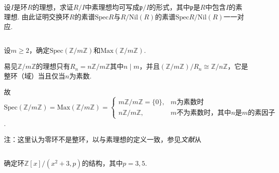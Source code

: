 \subsection{}
设$I$是环$R$的理想，求证$R/I$中素理想均可写成$\mathfrak{p}/I$的形式，其中$\mathfrak{p}$是$R$中包含$I$的素理想. 由此证明交换环$R$的素谱$\mathrm{Spec}R$与$R/\mathrm{Nil}(R)$的素谱$\mathrm{Spec}R/\mathrm{Nil}(R)$一一对应.


\subsection{}
设$m\geq 2$，确定$\mathrm{Spec}(\mathbb{Z}/m\mathbb{Z})$和$\mathrm{Max}(\mathbb{Z}/m\mathbb{Z})$.

\jie 易见$\mathbb{Z}/m\mathbb{Z}$的理想只有$R_n=n\mathbb{Z}/m\mathbb{Z}$其中$n\mid m$，并且$(\mathbb{Z}/m\mathbb{Z})/R_n\cong\mathbb{Z}/n\mathbb{Z}$，它是整环（域）当且仅当$n$为素数.

故$\mathrm{Spec}(\mathbb{Z}/m\mathbb{Z})=\mathrm{Max}(\mathbb{Z}/m\mathbb{Z})
=\begin{cases}
m\mathbb{Z}/m\mathbb{Z}=\{0\}, & m\text{为素数时}\\
n\mathbb{Z}/m\mathbb{Z}, &m\text{不为素数时，其中}n\text{是}m\text{的素因子}
\end{cases}
$.

注：这里认为零环不是整环，以与素理想的定义一致，参见\emph{文献}\cite{1326600}从

\subsection{}
确定环$\mathbb{Z}[x]/(x^2+3, p)$的结构，其中$p=3,5$.

